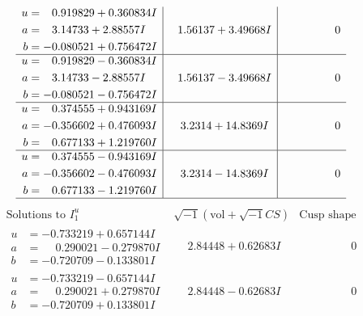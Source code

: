 \documentclass[1p]{elsarticle_modified}
\theoremstyle{definition}
\newcommand{\I}{\sqrt{-1}}
\begin{document}
$$\begin{array}{c|c|c}
\begin{aligned}
u &= \phantom{-}0.919829 + 0.360834 I \\
a &= \phantom{-}3.14733 + 2.88557 I \\
b &= -0.080521 + 0.756472 I\end{aligned}
 & \phantom{-}1.56137 + 3.49668 I & \phantom{-0.000000 } 0 \\ \hline\begin{aligned}
u &= \phantom{-}0.919829 - 0.360834 I \\
a &= \phantom{-}3.14733 - 2.88557 I \\
b &= -0.080521 - 0.756472 I\end{aligned}
 & \phantom{-}1.56137 - 3.49668 I & \phantom{-0.000000 } 0 \\ \hline\begin{aligned}
u &= \phantom{-}0.374555 + 0.943169 I \\
a &= -0.356602 + 0.476093 I \\
b &= \phantom{-}0.677133 + 1.219760 I\end{aligned}
 & \phantom{-}3.2314 + 14.8369 I & \phantom{-0.000000 } 0 \\ \hline\begin{aligned}
u &= \phantom{-}0.374555 - 0.943169 I \\
a &= -0.356602 - 0.476093 I \\
b &= \phantom{-}0.677133 - 1.219760 I\end{aligned}
 & \phantom{-}3.2314 - 14.8369 I & \phantom{-0.000000 } 0\\
 \hline 
 \end{array}$$\newpage$$\begin{array}{c|c|c}  
\text{Solutions to }I^u_{1}& \I (\text{vol} + \sqrt{-1}CS) & \text{Cusp shape}\\
 \hline 
\begin{aligned}
u &= -0.733219 + 0.657144 I \\
a &= \phantom{-}0.290021 - 0.279870 I \\
b &= -0.720709 - 0.133801 I\end{aligned}
 & \phantom{-}2.84448 + 0.62683 I & \phantom{-0.000000 } 0 \\ \hline\begin{aligned}
u &= -0.733219 - 0.657144 I \\
a &= \phantom{-}0.290021 + 0.279870 I \\
b &= -0.720709 + 0.133801 I\end{aligned}
 & \phantom{-}2.84448 - 0.62683 I & \phantom{-0.000000 } 0 \\ \hline\begin{aligned}

\end{aligned}
\end{array}$$
\end{document}
